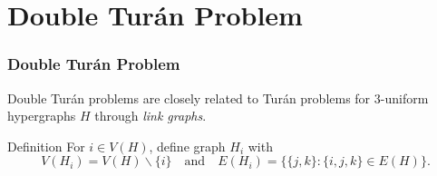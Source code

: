 \documentclass{beamer}
\begin{document}
\section{Double Turán Problem}

\begin{frame}
  \frametitle{Double Turán Problem}

  Double Turán problems are closely related to Turán problems for $3$-uniform hypergraphs $H$ through \textit{link graphs}.

  \pause

  \vspace{0.3cm}

  \begin{block}{Definition}
    For $i \in V(H)$, define graph $H_i$ with
    \[
      V(H_i) = V(H) \backslash \{i\} \quad \text{and} \quad E(H_i) = \{\{j, k\} : \{i, j, k\} \in E(H)\}.
    \]
  \end{block}
\end{frame}
\end{document}
